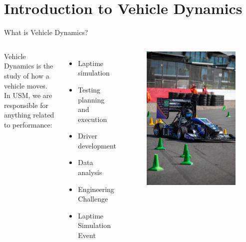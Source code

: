 \section*{Introduction to Vehicle Dynamics}

\begin{frame}{What is Vehicle Dynamics?}
    \begin{columns}
        Vehicle Dynamics is the study of how a vehicle moves. \\
        \vspace*{2ex}
        In USM, we are responsible for anything related to performance:
        \begin{itemize}
            \item Laptime simulation
            \item Testing planning and execution
            \item Driver development
            \item Data analysis
            \item Engineering Challenge
            \item Laptime Simulation Event
        \end{itemize}
        \begin{figure}
            \includegraphics[width=\textwidth]{../../res/car/FSUK Cornering.jpg}
        \end{figure}
    \end{columns}
\end{frame}
